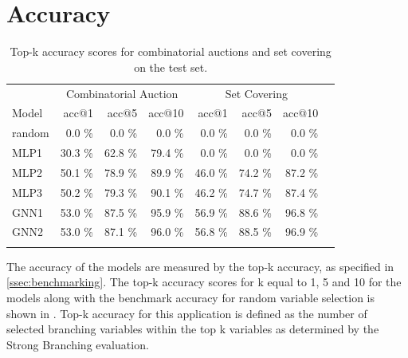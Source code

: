 \section{Accuracy}\label{accuracy}\label{sec:res_accuracy}


\begin{scriptsize}
\begin{table}[ht]
	\centering
	\begin{tabular}{lrrrrrrr}
		\toprule
		& \multicolumn{3}{c}{Combinatorial Auction} & \multicolumn{3}{c}{Set Covering}\\ 
		\cmidrule(lr){2-4} \cmidrule(lr){5-7}
		Model & acc@1 & acc@5 & acc@10 & acc@1 & acc@5 & acc@10 \\
		\midrule
		random & 0.0 \% & 0.0 \% & 0.0 \% & 0.0 \% & 0.0 \% & 0.0 \%\\
		MLP1 & 30.3 \% & 62.8 \% & 79.4 \% & 0.0 \% & 0.0 \% & 0.0 \%\\
		MLP2 & 50.1 \% & 78.9 \% & 89.9 \% & 46.0 \% & 74.2 \% & 87.2 \%\\
		MLP3 & 50.2 \% & 79.3 \% & 90.1 \% & 46.2 \% & 74.7 \% & 87.4 \%\\
		GNN1 & 53.0 \% & 87.5 \% & 95.9 \% & 56.9 \% & 88.6 \% & 96.8 \%\\
		GNN2 & 53.0 \% & 87.1 \% & 96.0 \% & 56.8 \% & 88.5 \% & 96.9 \%\\
		\addlinespace
		\bottomrule
	\end{tabular}
	\caption{Top-k accuracy scores for combinatorial auctions and set covering on the test set.}\label{tab:accs}
\end{table}
\end{scriptsize}

 
The accuracy of the models are measured by the top-k accuracy, as specified in \cref{ssec:benchmarking}.
The top-k accuracy scores for k equal to 1, 5 and 10 for the models along with the benchmark accuracy for random variable selection is shown in . Top-k accuracy for this application is defined as the number of selected branching variables within the top k variables as determined by the Strong Branching evaluation. 

